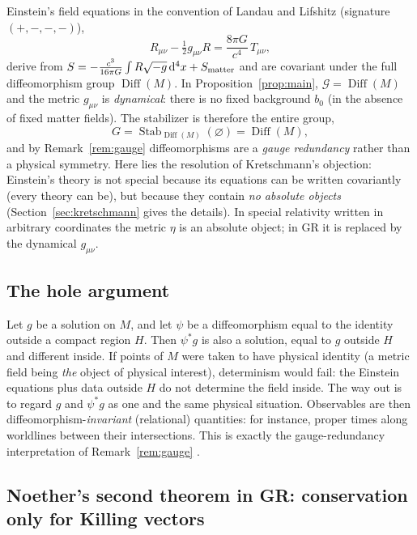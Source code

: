 \documentclass[11pt,a4paper,openany]{book}
\theoremstyle{definition}
\theoremstyle{plain}
\theoremstyle{remark}
\newcommand{\dd}{\mathrm{d}}
\DeclareMathOperator{\Stab}{Stab}
\DeclareMathOperator{\Diff}{Diff}
\begin{document}
Einstein's field equations in the convention of Landau and Lifshitz
(signature $(+,-,-,-)$),
\begin{equation}\label{eq:einstein}
  R_{\mu\nu}-\tfrac12 g_{\mu\nu}R=\frac{8\pi G}{c^4}\,T_{\mu\nu},
\end{equation}
derive from $S=-\tfrac{c^3}{16\pi G}\int R\sqrt{-g}\,\dd^4x+S_{\rm matter}$
and are covariant under the full diffeomorphism group $\Diff(M)$. In
Proposition~\ref{prop:main}, $\mathcal G=\Diff(M)$ and the metric $g_{\mu\nu}$
is \emph{dynamical}: there is no fixed background $b_0$ (in the absence of
fixed matter fields). The stabilizer is therefore the entire group,
\begin{equation}
  G=\Stab_{\Diff(M)}(\varnothing)=\Diff(M),
\end{equation}
and by Remark~\ref{rem:gauge} diffeomorphisms are a \emph{gauge redundancy}
rather than a physical symmetry. Here lies the resolution of Kretschmann's
objection: Einstein's theory is not special because its equations can be
written covariantly (every theory can be), but because they contain
\emph{no absolute objects} \cite{anderson} (Section~\ref{sec:kretschmann} gives
the details). In special relativity written in arbitrary coordinates the metric $\eta$ is an absolute object; in GR it is
replaced by the dynamical $g_{\mu\nu}$.

\subsection{The hole argument}

Let $g$ be a solution on $M$, and let $\psi$ be a diffeomorphism equal to the
identity outside a compact region $H$. Then $\psi^*g$ is also a solution,
equal to $g$ outside $H$ and different inside. If points of $M$ were taken to
have physical identity (a metric field being \emph{the} object of physical
interest), determinism would fail: the Einstein equations plus data outside $H$
do not determine the field inside. The way out is to regard $g$ and $\psi^*g$
as one and the same physical situation. Observables are then
diffeomorphism-\emph{invariant} (relational) quantities: for instance,
proper times along worldlines between their intersections. This is exactly
the gauge-redundancy interpretation of Remark~\ref{rem:gauge}
\cite{earman,norton}.

\subsection{Noether's second theorem in GR: conservation only for Killing vectors}
\end{document}
